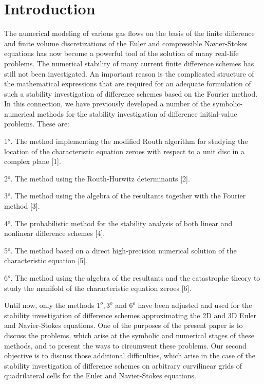 \section{Introduction}
\hspace{6mm}
    The numerical modeling of various gas flows on the basis of the finite
difference and finite volume discretizations of the Euler and compressible
Navier-Stokes equations has now become a powerful tool of the solution of many
real-life problems. The numerical stability of many current finite difference
schemes has still not been investigated. An important reason is the complicated
structure of the mathematical expressions that are required for an adequate
formulation of such a stability investigation of difference schemes based on the
Fourier method. In this connection, we have previously developed a number of the
symbolic-numerical methods for the stability investigation of difference
initial-value problems. These are:

 1$^o$. The method implementing the modified Routh algorithm for studying the
location of the characteristic equation zeroes with respect to a unit disc in
a complex plane [1].

 2$^o$. The method using the Routh-Hurwitz determinants [2].

 3$^o$. The method using the algebra of the resultants together with the
Fourier method [3].

 4$^o$. The probabilistic method for the stability analysis of both linear and
nonlinear difference schemes [4].

 5$^o$. The method based on a direct high-precision numerical solution of the
characteristic equation [5].

 6$^o$. The method using the algebra of the resultants and the catastrophe
theory to study the manifold of the characteristic equation zeroes [6].

   Until now, only the methods $1^o,3^o$ and $6^o$ have been adjusted and used
for the stability investigation of difference schemes approximating the 2D and
3D Euler and Navier-Stokes equations. One of the purposes of the present
paper is to discuss the problems, which arise at the symbolic and numerical
stages of these methods, and to present the ways to circumwent these problems.
Our second objective is to discuss those additional difficulties, which arise
in the case of the stability investigation of difference schemes on arbitrary
curvilinear grids of quadrilateral cells for the Euler and Navier-Stokes
equations.

